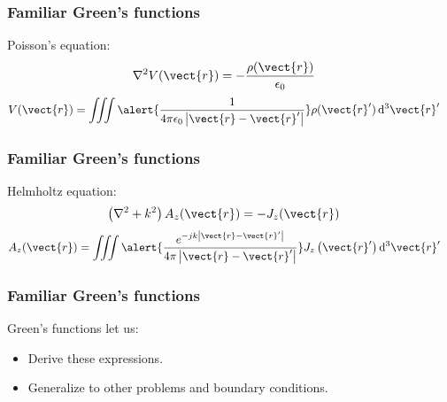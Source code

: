 \documentclass[12 pt, compress, handout, intlimits]{beamer}
\renewcommand{\d}{\operatorname{d}\!}
\begin{document}
\begin{frame}[fragile]
    \frametitle{Familiar Green's functions}

    Poisson's equation:
    \begin{align*}
        \nabla^2 V(\vect{r}) &= - \frac{\rho(\vect{r})}{\epsilon_0}
    \end{align*}
    \begin{align*}
        V(\vect{r}) &= \iiint \alert{\frac{1}{4 \pi \epsilon_0 \left| \vect{r} - \vect{r}' \right|}} \rho(\vect{r}') \d^3 \vect{r}'
    \end{align*}
\end{frame}


\begin{frame}[fragile]
    \frametitle{Familiar Green's functions}
    
    Helmholtz equation:
    \begin{align*}
        \left( \nabla^2 + k^2 \right) A_z(\vect{r}) &= -J_z(\vect{r})
    \end{align*}
    \begin{align*}
        A_z(\vect{r}) &= \iiint \alert{\frac{e^{-jk \left| \vect{r} - \vect{r}' \right|}}{4 \pi \left| \vect{r} - \vect{r}' \right|}} J_z\left( \vect{r}' \right) \d^3 \vect{r}'
    \end{align*}
\end{frame}


\begin{frame}[fragile]
    \frametitle{Familiar Green's functions}
    
    Green's functions let us:
    \begin{itemize}
    \item
        Derive these expressions.
    \item
        Generalize to other problems and boundary conditions.
    \end{itemize}
    
\end{frame}
\end{document}

